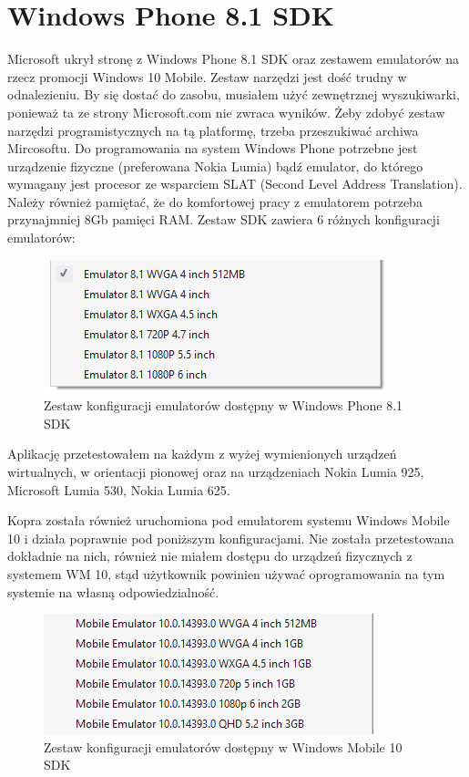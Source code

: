 \documentclass[a4paper,twoside,titlepage,openright]{book}
\begin{document}
\section{Windows Phone 8.1 SDK}
Microsoft ukrył stronę z Windows Phone 8.1 SDK oraz zestawem emulatorów na rzecz promocji Windows 10 Mobile. Zestaw narzędzi jest dość trudny w odnalezieniu. By się dostać do zasobu, musiałem użyć zewnętrznej wyszukiwarki, ponieważ ta ze strony Microsoft.com nie zwraca wyników. Żeby zdobyć zestaw narzędzi programistycznych na tą platformę, trzeba przeszukiwać archiwa Mircosoftu. \cite{tajneArchiwaMicrosoftu} Do programowania na system Windows Phone potrzebne jest urządzenie fizyczne (preferowana Nokia Lumia) bądź emulator, do którego wymagany jest procesor ze wsparciem SLAT (Second Level Address Translation). Należy również pamiętać, że do komfortowej pracy z emulatorem potrzeba przynajmniej 8Gb pamięci RAM. Zestaw SDK zawiera 6 różnych konfiguracji emulatorów: 

\begin{figure}[htp]
	\centering
			\includegraphics[resolution=120]{emulatory.png}
		\caption{Zestaw konfiguracji emulatorów dostępny w Windows Phone 8.1 SDK}
\end{figure}

Aplikację przetestowałem na każdym z wyżej wymienionych urządzeń wirtualnych, w orientacji pionowej oraz na urządzeniach Nokia Lumia 925, Microsoft Lumia 530, Nokia Lumia 625.

Kopra została również uruchomiona pod emulatorem systemu Windows Mobile 10 i działa poprawnie pod poniższym konfiguracjami. Nie została przetestowana dokładnie na nich, również nie miałem dostępu do urządzeń fizycznych z systemem WM 10, stąd użytkownik powinien używać oprogramowania na tym systemie na własną odpowiedzialność.

\begin{figure}[htp]
	\centering
			\includegraphics[resolution=120]{emulatoryWin10.png}
		\caption{Zestaw konfiguracji emulatorów dostępny w Windows Mobile 10 SDK}
\end{figure}
\end{document}
